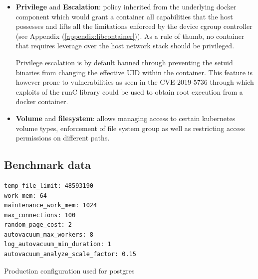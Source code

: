 \documentclass[11pt]{article}
\begin{document}
\begin{itemize}
\renewcommand\labelitemi{--}
    \item \textbf{Privilege} and \textbf{Escalation}: \newline policy inherited from the underlying docker component which would grant a container all capabilities that the host possesses and lifts all the limitations enforced by the device cgroup controller (see Appendix (\ref{appendix:libcontainer})). As a rule of thumb, no container that requires leverage over the host network stack should be privileged.
    
    Privilege escalation is by default banned through preventing the setuid binaries from changing the effective UID within the container. This feature is however prone to vulnerabilities as seen in the CVE-2019-5736 \autocite{CVE-2019-5736} through which exploits of the runC library could be used to obtain root execution from a docker container.
    
        \item \textbf{Volume} and \textbf{filesystem}: \newline allows managing access to certain kubernetes volume types, enforcement of file system group as well as restricting access permissions on different paths.
\end{itemize}

\subsection{Benchmark data}

\begin{listing}[H]
\begin{verbatim}
temp_file_limit: 48593190
work_mem: 64
maintenance_work_mem: 1024
max_connections: 100
random_page_cost: 2
autovacuum_max_workers: 8
log_autovacuum_min_duration: 1
autovacuum_analyze_scale_factor: 0.15
\end{verbatim}
\caption{Production configuration used for postgres}
\label{list:prod}
\end{listing}


    
    
\end{document}
